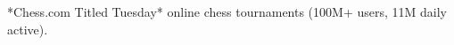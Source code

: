 \documentclass[preview]{standalone}
\begin{document}
*Chess.com Titled Tuesday* online chess tournaments (100M+ users, 11M daily active).\\
\end{document}
